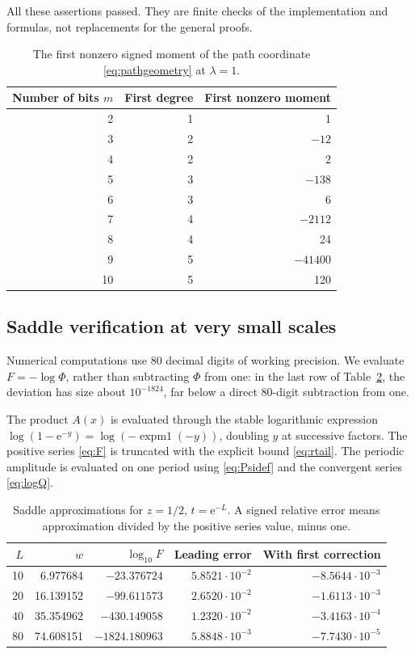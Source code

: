 \documentclass[11pt,oneside]{article}
\numberwithin{equation}{section}
\theoremstyle{definition}
\theoremstyle{remark}
\newcommand{\e}{\mathrm e}
\begin{document}
All these assertions passed. They are finite checks of the implementation and
formulas, not replacements for the general proofs.

\begin{table}[htbp]
\centering
\caption{The first nonzero signed moment of the path coordinate
\eqref{eq:pathgeometry} at \(\lambda=1\).}
\label{tab:path}
\begin{tabular}{@{}rrr@{}}
\toprule
Number of bits \(m\)&First degree&First nonzero moment\\
\midrule
2&1&1\\
3&2&\(-12\)\\
4&2&2\\
5&3&\(-138\)\\
6&3&6\\
7&4&\(-2112\)\\
8&4&24\\
9&5&\(-41400\)\\
10&5&120\\
\bottomrule
\end{tabular}
\end{table}

\subsection{Saddle verification at very small scales}
Numerical computations use 80 decimal digits of working precision. We evaluate
\(F=-\log\Phi\), rather than subtracting \(\Phi\) from one: in the last row
of Table~\ref{tab:saddle}, the deviation has size about \(10^{-1824}\), far
below a direct 80-digit subtraction from one.

The product \(A(x)\) is evaluated through the stable logarithmic expression
\(\log(1-\e^{-y})=\log(-\operatorname{expm1}(-y))\), doubling \(y\) at
successive factors. The positive series \eqref{eq:F} is truncated with the
explicit bound \eqref{eq:rtail}. The periodic amplitude is evaluated on one
period using \eqref{eq:Psidef} and the convergent series \eqref{eq:logQ}.

\begin{table}[htbp]
\centering
\small
\caption{Saddle approximations for \(z=1/2\), \(t=\e^{-L}\). A signed
relative error means approximation divided by the positive series value,
minus one.}
\label{tab:saddle}
\begin{tabular}{@{}rrrrr@{}}
\toprule
\(L\)&\(w\)&\(\log_{10}F\)&Leading error&With first correction\\
\midrule
10&6.977684&\(-23.376724\)&\(5.8521\cdot10^{-2}\)&\(-8.5644\cdot10^{-3}\)\\
20&16.139152&\(-99.611573\)&\(2.6520\cdot10^{-2}\)&\(-1.6113\cdot10^{-3}\)\\
40&35.354962&\(-430.149058\)&\(1.2320\cdot10^{-2}\)&\(-3.4163\cdot10^{-4}\)\\
80&74.608151&\(-1824.180963\)&\(5.8848\cdot10^{-3}\)&\(-7.7430\cdot10^{-5}\)\\
\bottomrule
\end{tabular}
\end{table}
\end{document}
